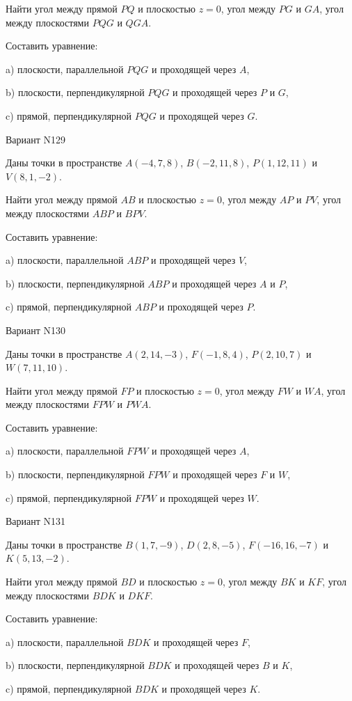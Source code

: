 \documentclass[11pt]{report}
\begin{document}
Найти угол между прямой $PQ$ и плоскостью $z = 0$, угол между $PG$ и $GA$, угол между плоскостями $PQG$ 
и $QGA$.

Составить уравнение: 

a) плоскости, параллельной $PQG$ и проходящей через $A$,

b) плоскости, перпендикулярной $PQG$ и проходящей через $P$ и $G$,

c) прямой, перпендикулярной $PQG$ и проходящей через $G$.

Вариант N129

Даны точки в пространстве
$A(-4, 7, 8)$, $B(-2, 11, 8)$, $P(1, 12, 11)$ и
$V(8, 1, -2)$.

Найти угол между прямой $AB$ и плоскостью $z = 0$, угол между $AP$ и $PV$, угол между плоскостями $ABP$ 
и $BPV$.

Составить уравнение: 

a) плоскости, параллельной $ABP$ и проходящей через $V$,

b) плоскости, перпендикулярной $ABP$ и проходящей через $A$ и $P$,

c) прямой, перпендикулярной $ABP$ и проходящей через $P$.

Вариант N130

Даны точки в пространстве
$A(2, 14, -3)$, $F(-1, 8, 4)$, $P(2, 10, 7)$ и
$W(7, 11, 10)$.

Найти угол между прямой $FP$ и плоскостью $z = 0$, угол между $FW$ и $WA$, угол между плоскостями $FPW$ 
и $PWA$.

Составить уравнение: 

a) плоскости, параллельной $FPW$ и проходящей через $A$,

b) плоскости, перпендикулярной $FPW$ и проходящей через $F$ и $W$,

c) прямой, перпендикулярной $FPW$ и проходящей через $W$.

Вариант N131

Даны точки в пространстве
$B(1, 7, -9)$, $D(2, 8, -5)$, $F(-16, 16, -7)$ и
$K(5, 13, -2)$.

Найти угол между прямой $BD$ и плоскостью $z = 0$, угол между $BK$ и $KF$, угол между плоскостями $BDK$ 
и $DKF$.

Составить уравнение: 

a) плоскости, параллельной $BDK$ и проходящей через $F$,

b) плоскости, перпендикулярной $BDK$ и проходящей через $B$ и $K$,

c) прямой, перпендикулярной $BDK$ и проходящей через $K$.
\end{document}
